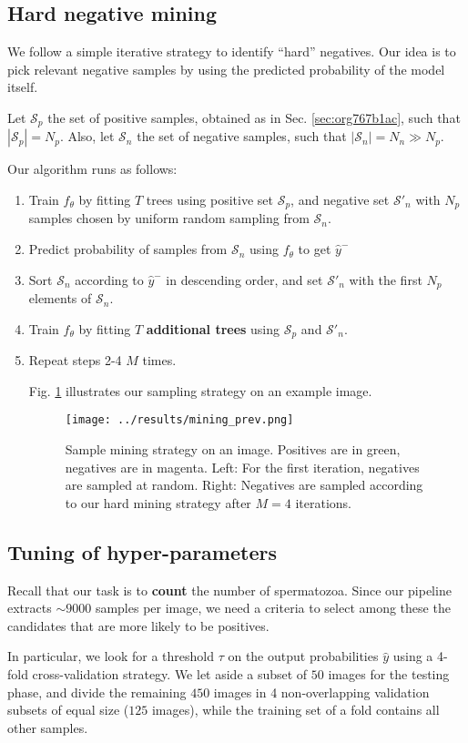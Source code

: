 \documentclass[11pt]{article}
\begin{document}
\subsection{Hard negative mining}
\label{sec:org1dc96ba}

We follow a simple iterative strategy to identify ``hard'' negatives.
Our idea is to pick relevant negative samples by using the predicted probability of the model itself.

Let \(\mathcal{S}_p\) the set of positive samples, obtained as in Sec. \ref{sec:org767b1ac}, such that \(|\mathcal{S}_p|=N_p\).
Also, let \(\mathcal{S}_n\) the set of negative samples, such that \(|\mathcal{S}_n|=N_n \gg N_p\).

Our algorithm runs as follows:

\begin{enumerate}
\item Train \(f_\theta\) by fitting \(T\) trees using positive set \(\mathcal{S}_p\), and negative set \(\mathcal{S}'_n\) with \(N_p\)
samples chosen by uniform random sampling from \(\mathcal{S}_n\).
\item Predict probability of samples from \(\mathcal{S}_n\) using \(f_\theta\) to get \(\hat{y}^-\)
\item Sort \(\mathcal{S}_n\) according to \(\hat{y}^-\) in descending order, and set
\(\mathcal{S}'_n\) with the first \(N_p\) elements of \(\mathcal{S}_n\).
\item Train \(f_\theta\) by fitting \(T\) \textbf{additional trees} using \(\mathcal{S}_p\) and \(\mathcal{S}'_n\).
\item Repeat steps 2-4 \(M\) times.

Fig. \ref{fig:orgcbb9719} illustrates our sampling strategy on an example image.

\begin{figure}[htbp]
\centering
\texttt{[image: ../results/mining\_prev.png]}
\caption{\label{fig:orgcbb9719}Sample mining strategy on an image. Positives are in green, negatives are in magenta. Left: For the first iteration, negatives are sampled at random. Right: Negatives are sampled according to our hard mining strategy after \(M=4\) iterations.}
\end{figure}
\end{enumerate}

\subsection{Tuning of hyper-parameters}
\label{sec:org84adf9d}

Recall that our task is to \textbf{count} the number of spermatozoa.
Since our pipeline extracts \(\sim 9000\) samples per image, we need a criteria to select among these the
candidates that are more likely to be positives.

In particular, we look for a threshold \(\tau\) on the output probabilities \(\hat{y}\)
using a 4-fold cross-validation strategy.
We let aside a subset of \(50\) images for the testing phase, and divide the remaining \(450\)
images in 4 non-overlapping validation subsets of equal size (\(125\) images), while
the training set of a fold contains all other samples.
\end{document}
